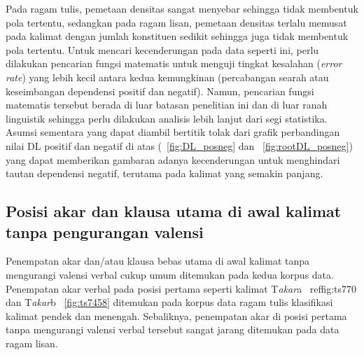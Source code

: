 Pada ragam tulis, pemetaan densitas sangat menyebar sehingga tidak membentuk pola tertentu, sedangkan pada ragam lisan, pemetaan densitas terlalu memusat pada kalimat dengan jumlah konstituen sedikit sehingga juga tidak membentuk pola tertentu. Untuk mencari kecenderungan pada data seperti ini, perlu dilakukan pencarian fungsi matematis untuk menguji tingkat kesalahan (\textit{error rate}) yang lebih kecil antara kedua kemungkinan (percabangan searah atau keseimbangan dependensi positif dan negatif). Namun, pencarian fungsi matematis tersebut berada di luar batasan penelitian ini dan di luar ranah linguistik sehingga perlu dilakukan analisis lebih lanjut dari segi statistika. Asumsi sementara yang dapat diambil bertitik tolak dari grafik perbandingan nilai DL positif dan negatif di atas (\pic~\ref{fig:DL_posneg} dan \pic~\ref{fig:rootDL_posneg}) yang dapat memberikan gambaran adanya kecenderungan untuk menghindari tautan dependensi negatif, terutama pada kalimat yang semakin panjang.

\subsection{Posisi akar dan klausa utama di awal kalimat tanpa pengurangan valensi}
Penempatan akar dan/atau klausa bebas utama di awal kalimat tanpa mengurangi valensi verbal cukup umum ditemukan pada kedua korpus data. Penempatan akar verbal pada posisi pertama seperti kalimat T\textit{akar}a \pic~ref{fig:ts770} dan T\textit{akar}b \pic~\ref{fig:ts7458} ditemukan pada korpus data ragam tulis klasifikasi kalimat pendek dan menengah. Sebaliknya, penempatan akar di posisi pertama tanpa mengurangi valensi verbal tersebut sangat jarang ditemukan pada data ragam lisan.

